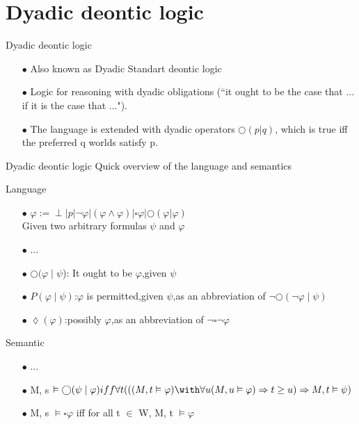 \documentclass{beamer}
\begin{document}
\section{Dyadic deontic logic}
\begin{frame}{Dyadic deontic logic}
\begin{enumerate}
\item[$\bullet$]Also known as Dyadic Standart deontic logic
\item[$\bullet$]Logic for reasoning with dyadic obligations (“it ought to be the case that ... if it is the case that ...").
\item[$\bullet$]The language is extended with dyadic operators  $\bigcirc(p|q)$, which is true iff the preferred q worlds satisfy p.
\end{enumerate}
\end{frame}
\begin{frame}{Dyadic deontic logic}
Quick overview of the language and semantics
\begin{block}{Language}
\begin{enumerate}
\item[$\bullet$]$\varphi := \perp | p | \neg \varphi |(\varphi \wedge \varphi)|\square \varphi |\bigcirc(\varphi|\varphi)$\\
Given two arbitrary formulas $\psi$  and $\varphi$
\item[$\bullet$]...
\item[$\bullet$]$\bigcirc(\varphi\mid\psi$): It ought to be $\varphi$,given $\psi$\\
\item[$\bullet$]$P(\varphi\mid\psi) $:$\varphi$ is permitted,given $\psi$,as an abbreviation of $\neg\bigcirc(\neg\varphi\mid\psi)$\\
\item[$\bullet$]$\lozenge(\varphi)$:possibly $\varphi$,as an abbreviation of $\neg\square\neg\varphi$\\
\end{enumerate}
\end{block}
\begin{block}{Semantic}
\begin{enumerate}
\item[$\bullet$]...
\item[$\bullet$]M, s $ \vDash  \bigcirc(\psi\mid\varphi) iff \forall t(((M, t \vDash \varphi)\with\forall u(M, u \vDash \varphi) \Rightarrow t \geq u) \Rightarrow M, t \vDash \psi)$
\item[$\bullet$]M, s $ \vDash  \square\varphi$ iff for all t $\in$ W, M, t $\vDash \varphi$
\end{enumerate}
\end{block}

\end{frame}
\end{document}
